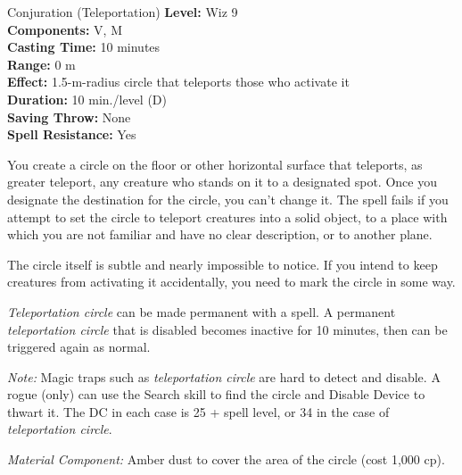 {Conjuration (Teleportation)}
{
	\textbf{Level:}
	Wiz 9\\
	\textbf{Components:}
	V, M\\
	\textbf{Casting Time:}
	10 minutes\\
	\textbf{Range:}
	0 m\\
	\textbf{Effect:}
	1.5-m-radius circle that teleports those who activate it\\
	\textbf{Duration:}
	10 min./level (D)\\
	\textbf{Saving Throw:}
	None\\
	\textbf{Spell Resistance:}
	Yes\\
}
{
	You create a circle on the floor or other horizontal surface that teleports, as greater teleport, any creature who stands on it to a designated spot. Once you designate the destination for the circle, you can't change it. The spell fails if you attempt to set the circle to teleport creatures into a solid object, to a place with which you are not familiar and have no clear description, or to another plane.

	The circle itself is subtle and nearly impossible to notice. If you intend to keep creatures from activating it accidentally, you need to mark the circle in some way.

	\emph{Teleportation circle} can be made permanent with a  spell. A permanent \emph{teleportation circle} that is disabled becomes inactive for 10 minutes, then can be triggered again as normal.

	\textit{Note:}
	Magic traps such as \emph{teleportation circle} are hard to detect and disable. A rogue (only) can use the Search skill to find the circle and Disable Device to thwart it. The DC in each case is 25 + spell level, or 34 in the case of \emph{teleportation circle}.

	\textit{Material Component:}
	Amber dust to cover the area of the circle (cost 1,000 cp).

}
